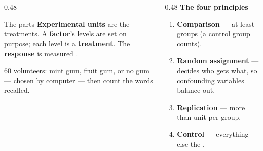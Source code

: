 \documentclass[aspectratio=169, 11pt]{beamer}
\begin{document}
\begin{frame}[t, plain]
  \vspace{2pt}
  \begin{columns}[t]
    \begin{column}{0.48\textwidth}
      \begin{block}{The parts}
        \textbf{Experimental units} are  the treatments.
        A \textbf{factor}'s levels are set on purpose; each level is a \textbf{treatment}.
        The \textbf{response} is measured .
      \end{block}
      \vspace{3pt}
      {\small 60 volunteers: mint gum, fruit gum, or no gum --- chosen by computer --- then
      count the words recalled.}
    \end{column}
    \begin{column}{0.48\textwidth}
      {\small\textbf{The four principles}}
      \begin{enumerate}\setlength{\itemsep}{3pt}\small
        \item \textbf{Comparison} --- at least  groups (a control group counts).
        \item \textbf{Random assignment} ---  decides who gets what, so
              confounding variables balance out.
        \item \textbf{Replication} --- more than  unit per group.
        \item \textbf{Control} --- everything else the .
      \end{enumerate}
    \end{column}
  \end{columns}
\end{frame}
\end{document}
